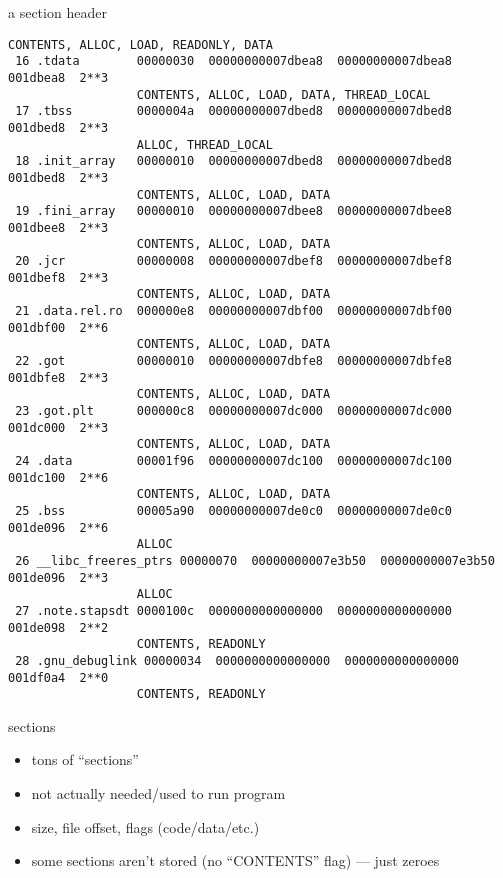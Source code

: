 \begin{frame}[fragile,label=sectHeader]{a section header}
\begin{Verbatim}[fontsize=\tiny]
                  CONTENTS, ALLOC, LOAD, READONLY, DATA
 16 .tdata        00000030  00000000007dbea8  00000000007dbea8  001dbea8  2**3
                  CONTENTS, ALLOC, LOAD, DATA, THREAD_LOCAL
 17 .tbss         0000004a  00000000007dbed8  00000000007dbed8  001dbed8  2**3
                  ALLOC, THREAD_LOCAL
 18 .init_array   00000010  00000000007dbed8  00000000007dbed8  001dbed8  2**3
                  CONTENTS, ALLOC, LOAD, DATA
 19 .fini_array   00000010  00000000007dbee8  00000000007dbee8  001dbee8  2**3
                  CONTENTS, ALLOC, LOAD, DATA
 20 .jcr          00000008  00000000007dbef8  00000000007dbef8  001dbef8  2**3
                  CONTENTS, ALLOC, LOAD, DATA
 21 .data.rel.ro  000000e8  00000000007dbf00  00000000007dbf00  001dbf00  2**6
                  CONTENTS, ALLOC, LOAD, DATA
 22 .got          00000010  00000000007dbfe8  00000000007dbfe8  001dbfe8  2**3
                  CONTENTS, ALLOC, LOAD, DATA
 23 .got.plt      000000c8  00000000007dc000  00000000007dc000  001dc000  2**3
                  CONTENTS, ALLOC, LOAD, DATA
 24 .data         00001f96  00000000007dc100  00000000007dc100  001dc100  2**6
                  CONTENTS, ALLOC, LOAD, DATA
 25 .bss          00005a90  00000000007de0c0  00000000007de0c0  001de096  2**6
                  ALLOC
 26 __libc_freeres_ptrs 00000070  00000000007e3b50  00000000007e3b50  001de096  2**3
                  ALLOC
 27 .note.stapsdt 0000100c  0000000000000000  0000000000000000  001de098  2**2
                  CONTENTS, READONLY
 28 .gnu_debuglink 00000034  0000000000000000  0000000000000000  001df0a4  2**0
                  CONTENTS, READONLY
\end{Verbatim}
\end{frame}

\begin{frame}{sections}
\begin{itemize}
\item tons of ``sections''
\item not actually needed/used to run program
\item size, file offset, flags (code/data/etc.)
\item some sections aren't stored (no ``CONTENTS'' flag) --- just zeroes
\end{itemize}
\end{frame}

